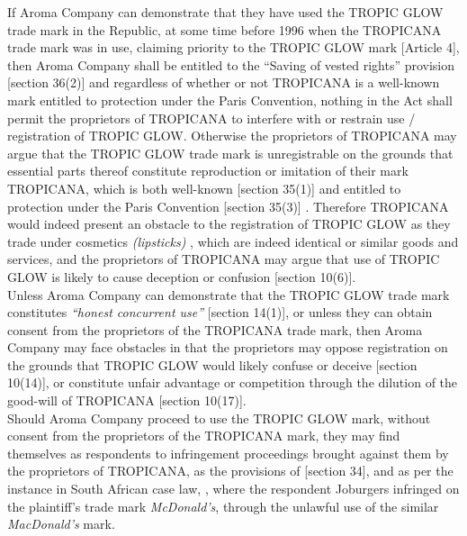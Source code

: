 \documentclass[11pt]{article}
\begin{document}
If Aroma Company can demonstrate that they have used the TROPIC GLOW trade mark
in the Republic, at some time before 1996 when the TROPICANA trade mark was in
use, claiming priority to the TROPIC GLOW mark [Article
4]\cite{wipo83_paris_conve_protect_ip}, then Aroma Company shall be entitled to the
``Saving of vested rights'' provision [section 36(2)]\cite{rsa93_tm_act} and
regardless of whether or not TROPICANA is a well-known mark entitled to
protection under the Paris Convention, nothing in the Act shall permit the
proprietors of TROPICANA to interfere with or restrain use / registration of
TROPIC GLOW. Otherwise the proprietors of TROPICANA may argue that the TROPIC
GLOW trade mark is unregistrable on the grounds that essential parts thereof
constitute reproduction or imitation of their mark TROPICANA, which is both
well-known [section 35(1)]\cite{rsa93_tm_act} and entitled to protection under the
Paris Convention [section 35(3)]\cite{rsa93_tm_act}
\cite{wipo83_paris_conve_protect_ip}. Therefore TROPICANA would indeed present an
obstacle to the registration of TROPIC GLOW as they trade under cosmetics
\emph{(lipsticks)} \cite{wipo57_ncl}, which are indeed identical or similar goods and services, and the
proprietors of TROPICANA may argue that use of TROPIC GLOW is likely to cause
deception or confusion [section 10(6)]\cite{rsa93_tm_act}.\\

Unless Aroma Company can demonstrate that the TROPIC GLOW trade mark constitutes
\emph{``honest concurrent use''} [section 14(1)]\cite{rsa93_tm_act}, or unless they can
obtain consent from the proprietors of the TROPICANA trade mark, then Aroma
Company may face obstacles in that the proprietors may oppose registration on
the grounds that TROPIC GLOW would likely confuse or deceive [section
10(14)]\cite{rsa93_tm_act}, or constitute unfair advantage or competition through
the dilution of the good-will of TROPICANA [section 10(17)]\cite{rsa93_tm_act}.\\

Should Aroma Company proceed to use the TROPIC GLOW mark, without consent from
the proprietors of the TROPICANA mark, they may find themselves as respondents
to infringement proceedings brought against them by the proprietors of
TROPICANA, as the provisions of [section 34]\cite{rsa93_tm_act}, and as per the
instance in South African case law, 
\cite{corbett97_mcd_v_joburgers}, where the respondent Joburgers infringed on the
plaintiff's trade mark \emph{McDonald's}, through the unlawful use of the similar
\emph{MacDonald's} mark.
\end{document}
